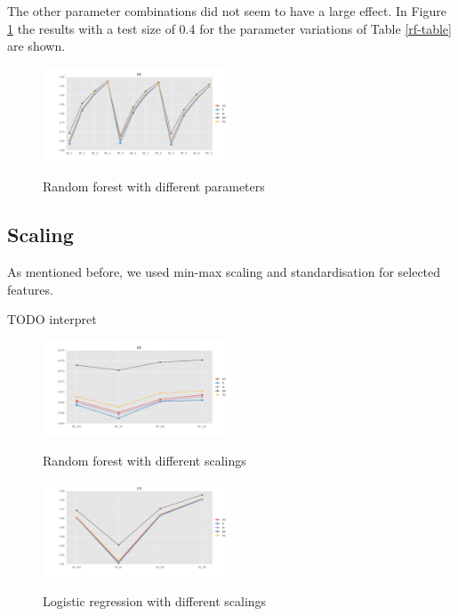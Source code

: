 \documentclass{sig-alternate-05-2015}
\begin{document}
The other parameter combinations did not seem to have a large effect.
In Figure \ref{fig:rf} the results with a test size of 0.4 for the parameter variations of Table \ref{rf-table} are shown.

\begin{figure}[h]
  \centering
  \caption{Random forest with different parameters}
  \includegraphics[width=0.5\textwidth]{../plots/RF_compare_param}
  \label{fig:rf}
\end{figure}

\subsection{Scaling}

As mentioned before, we used min-max scaling and standardisation for selected features.

TODO interpret

\begin{figure}[h]
  \centering
  \caption{Random forest with different scalings}
  \includegraphics[width=0.5\textwidth]{../plots/RF_compare_scaling}
  \label{fig:rf_scaling}
\end{figure}


\begin{figure}[h]
  \centering
  \caption{Logistic regression with different scalings}
  \includegraphics[width=0.5\textwidth]{../plots/LR_compare_scaling}
  \label{fig:lr_scaling}
\end{figure}
\end{document}

